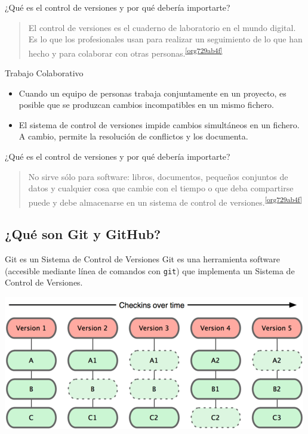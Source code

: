 \documentclass[aspectratio=169, xcolor={usenames,svgnames,dvipsnames}]{beamer}
\begin{document}
\begin{frame}[label={sec:org58140f2}]{¿Qué es el control de versiones y por qué debería importarte?}
\begin{quote}
El control de versiones es el \alert{cuaderno de laboratorio} en el mundo digital. Es lo que los profesionales usan para realizar un
\alert{seguimiento} de lo que han hecho y para \alert{colaborar} con otras
personas.\textsuperscript{\ref{org729ab4f}}
\end{quote}

\begin{block}{Trabajo Colaborativo}
\begin{itemize}
\item Cuando un equipo de personas trabaja conjuntamente en un proyecto, es posible que se produzcan cambios incompatibles en un mismo fichero.
\item El sistema de control de versiones \alert{impide} cambios simultáneos en un fichero. A cambio, permite la \alert{resolución de conflictos} y los documenta.
\end{itemize}
\end{block}
\end{frame}

\begin{frame}[label={sec:org8abafc4}]{¿Qué es el control de versiones y por qué debería importarte?}
\begin{quote}
\alert{No sirve sólo para software}: libros, documentos, pequeños conjuntos
de datos y cualquier cosa que cambie con el tiempo o que deba
compartirse puede y debe almacenarse en un sistema de control de
versiones.\textsuperscript{\ref{org729ab4f}}
\end{quote}
\end{frame}

\subsection{¿Qué son Git y GitHub?}
\label{sec:org837fca6}

\begin{frame}[fragile,label={sec:org2feedd4}]{Git es un Sistema de Control de Versiones}
 Git es una herramienta software (accesible mediante línea de comandos con \texttt{git}) que implementa un Sistema de Control de Versiones.

\begin{center}
\includegraphics[width=.9\linewidth]{figs/git_model.png}
\end{center}
\end{frame}
\end{document}
